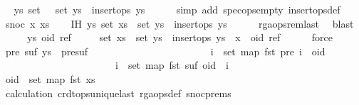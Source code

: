 \begin{isabellebody}
\ \isamarkupfalse%
\ {\isachardoublequoteopen}{\isasymexists}ys{\isachardot}\ set\ {\isacharbrackleft}{\isacharbrackright}\ {\isacharequal}\ set\ ys\ {\isasymand}\ insert{\isacharunderscore}ops\ ys{\isachardoublequoteclose}\isanewline
\ \ \ \ \isamarkupfalse%
\ {\isacharparenleft}simp\ add{\isacharcolon}\ spec{\isacharunderscore}ops{\isacharunderscore}empty\ insert{\isacharunderscore}ops{\isacharunderscore}def{\isacharparenright}\isanewline
{}\isamarkupfalse%
\isanewline
\ \ \isamarkupfalse%
\ {\isacharparenleft}snoc\ x\ xs{\isacharparenright}\isanewline
\ \ \isamarkupfalse%
\ IH{\isacharcolon}\ {\isachardoublequoteopen}{\isasymexists}ys{\isachardot}\ set\ xs\ {\isacharequal}\ set\ ys\ {\isasymand}\ insert{\isacharunderscore}ops\ ys{\isachardoublequoteclose}\isanewline
\ \ \ \ \isamarkupfalse%
\ rga{\isacharunderscore}ops{\isacharunderscore}rem{\isacharunderscore}last\ \isamarkupfalse%
\ blast\isanewline
\ \ \isamarkupfalse%
\ \isamarkupfalse%
\ ys\ oid\ ref\isanewline
\ \ \ \ \ {\isachardoublequoteopen}set\ xs\ {\isacharequal}\ set\ ys{\isachardoublequoteclose}\ \ {\isachardoublequoteopen}insert{\isacharunderscore}ops\ ys{\isachardoublequoteclose}\ \ {\isachardoublequoteopen}x\ {\isacharequal}\ {\isacharparenleft}oid{\isacharcomma}\ ref{\isacharparenright}{\isachardoublequoteclose}\isanewline
\ \ \ \ \isamarkupfalse%
\ force\isanewline
\ \ \isamarkupfalse%
\ \isamarkupfalse%
\ {\isachardoublequoteopen}{\isasymexists}pre\ suf{\isachardot}\ ys\ {\isacharequal}\ pre{\isacharat}suf\ {\isasymand}\isanewline
\ \ \ \ \ \ \ \ \ \ \ \ \ \ \ \ \ \ \ \ \ \ \ {\isacharparenleft}{\isasymforall}i\ {\isasymin}\ set\ {\isacharparenleft}map\ fst\ pre{\isacharparenright}{\isachardot}\ i\ {\isacharless}\ oid{\isacharparenright}\ {\isasymand}\isanewline
\ \ \ \ \ \ \ \ \ \ \ \ \ \ \ \ \ \ \ \ \ \ \ {\isacharparenleft}{\isasymforall}i\ {\isasymin}\ set\ {\isacharparenleft}map\ fst\ suf{\isacharparenright}{\isachardot}\ oid\ {\isacharless}\ i{\isacharparenright}{\isachardoublequoteclose}\isanewline
\ \ \isamarkupfalse%
\ {\isacharminus}\isanewline
\ \ \ \ \isamarkupfalse%
\ {\isachardoublequoteopen}oid\ {\isasymnotin}\ set\ {\isacharparenleft}map\ fst\ xs{\isacharparenright}{\isachardoublequoteclose}\isanewline
\ \ \ \ \ \ \isamarkupfalse%
\ calculation{\isacharparenleft}{}{\isacharparenright}\ crdt{\isacharunderscore}ops{\isacharunderscore}unique{\isacharunderscore}last\ rga{\isacharunderscore}ops{\isacharunderscore}def\ snoc{\isachardot}prems\ \isamarkupfalse%

\end{isabellebody}
